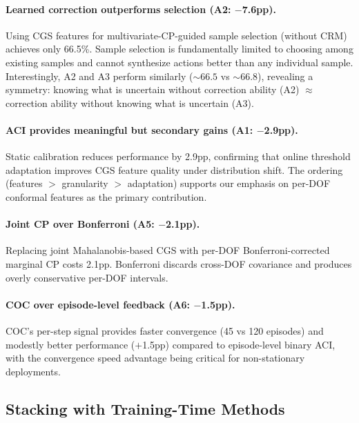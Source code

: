 \documentclass[10pt,letterpaper]{article}
\newcommand{\crm}{CRM}
\newcommand{\cgs}{CGS}
\newcommand{\coc}{COC}
\begin{document}
\paragraph{Learned correction outperforms selection (A2: $-$7.6pp).}
Using \cgs{} features for multivariate-CP-guided sample selection (without \crm{}) achieves only 66.5\%.
Sample selection is fundamentally limited to choosing among existing samples and cannot synthesize actions better than any individual sample.
Interestingly, A2 and A3 perform similarly (${\sim}66.5$ vs ${\sim}66.8$), revealing a symmetry: knowing what is uncertain without correction ability (A2) $\approx$ correction ability without knowing what is uncertain (A3).

\paragraph{ACI provides meaningful but secondary gains (A1: $-$2.9pp).}
Static calibration reduces performance by 2.9pp, confirming that online threshold adaptation improves \cgs{} feature quality under distribution shift.
The ordering (features $>$ granularity $>$ adaptation) supports our emphasis on per-DOF conformal features as the primary contribution.

\paragraph{Joint CP over Bonferroni (A5: $-$2.1pp).}
Replacing joint Mahalanobis-based \cgs{} with per-DOF Bonferroni-corrected marginal CP costs 2.1pp.
Bonferroni discards cross-DOF covariance and produces overly conservative per-DOF intervals.

\paragraph{COC over episode-level feedback (A6: $-$1.5pp).}
\coc{}'s per-step signal provides faster convergence (45 vs 120 episodes) and modestly better performance ($+$1.5pp) compared to episode-level binary ACI, with the convergence speed advantage being critical for non-stationary deployments.

\subsection{Stacking with Training-Time Methods}
\label{sec:stacking}
\end{document}
